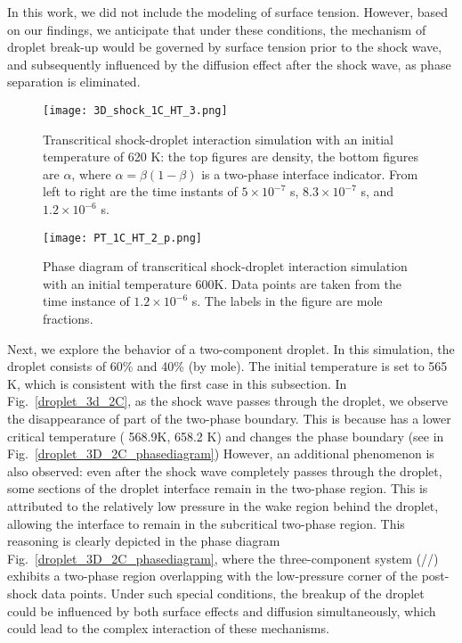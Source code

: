 In this work, we did not include the modeling of surface tension. However, based on our findings, we anticipate that under these conditions, the mechanism of droplet break-up would be governed by surface tension prior to the shock wave, and subsequently influenced by the diffusion effect after the shock wave, as phase separation is eliminated.




\begin{figure}[htbp]
\centering
\texttt{[image: 3D\_shock\_1C\_HT\_3.png]}
\caption{Transcritical shock-droplet interaction simulation with an initial temperature of 620 K: the top figures are density, the bottom figures are $\alpha$, where $\alpha = \beta (1-\beta)$ is a two-phase interface indicator. From left to right are the time instants of $5\times 10^{-7}$ s, $8.3\times 10^{-7}$ s, and $1.2\times 10^{-6}$ s.}
\label{droplet_3d_1C_HT} 
\end{figure}


\begin{figure}[htbp]
\centering
\texttt{[image: PT\_1C\_HT\_2\_p.png]}
\caption{Phase diagram of transcritical shock-droplet interaction simulation with an initial temperature 600K. Data points are taken from the time instance of $1.2\times 10^{-6}$ s. The labels in the figure are mole fractions.}
\label{droplet_3D_1C_HT_phasediagram} 
\end{figure}

Next, we explore the behavior of a two-component droplet. In this simulation, the droplet consists of 60\%  and 40\%  (by mole). The initial temperature is set to 565 K, which is consistent with the first case in this subsection. In Fig.~\ref{droplet_3d_2C}, as the shock wave passes through the droplet, we observe the disappearance of part of the two-phase boundary. This is because  has a lower critical temperature ( 568.9K,  658.2 K) and changes the phase boundary (see in Fig.~\ref{droplet_3D_2C_phasediagram}) However, an additional phenomenon is also observed: even after the shock wave completely passes through the droplet, some sections of the droplet interface remain in the two-phase region. This is attributed to the relatively low pressure in the wake region behind the droplet, allowing the interface to remain in the subcritical two-phase region. This reasoning is clearly depicted in the phase diagram Fig.~\ref{droplet_3D_2C_phasediagram}, where the three-component system (//) exhibits a two-phase region overlapping with the low-pressure corner of the post-shock data points. Under such special conditions, the breakup of the droplet could be influenced by both surface effects and diffusion simultaneously, which could lead to the complex interaction of these mechanisms.





